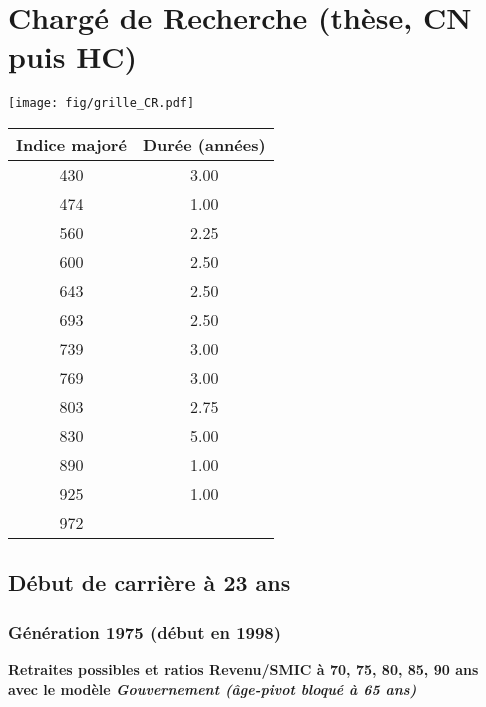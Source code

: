 \newpage 
 
\chapter{Chargé de Recherche (thèse, CN puis HC)} 

\begin{minipage}{0.55\linewidth}\texttt{[image: fig/grille\_CR.pdf]}\end{minipage} 
\begin{minipage}{0.3\linewidth} 
 \begin{center} 

\begin{tabular}[htb]{|c|c|} 
\hline 
 Indice majoré &  Durée (années) \\ 
\hline \hline 
 430 &  3.00 \\ 
\hline 
 474 &  1.00 \\ 
\hline 
 560 &  2.25 \\ 
\hline 
 600 &  2.50 \\ 
\hline 
 643 &  2.50 \\ 
\hline 
 693 &  2.50 \\ 
\hline 
 739 &  3.00 \\ 
\hline 
 769 &  3.00 \\ 
\hline 
 803 &  2.75 \\ 
\hline 
 830 &  5.00 \\ 
\hline 
 890 &  1.00 \\ 
\hline 
 925 &  1.00 \\ 
\hline 
 972 &   \\ 
\hline 
\hline 
\end{tabular} 
\end{center} 
 \end{minipage} 


 \addto{\captionsenglish}{ \renewcommand{\mtctitle}{}} \setcounter{minitocdepth}{2} 
 \minitoc \newpage 

\section{Début de carrière à 23 ans} 

\subsection{Génération 1975 (début en 1998)} 

{\bf \noindent Retraites possibles et ratios Revenu/SMIC à 70, 75, 80, 85, 90 ans avec le modèle \emph{Gouvernement (âge-pivot bloqué à 65 ans)}}  
 
